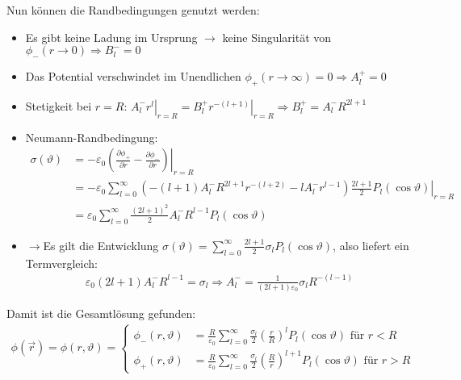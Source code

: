 		   Nun können die Randbedingungen genutzt werden:
		   \begin{itemize}
		   	\item Es gibt keine Ladung im Ursprung $\to$ keine Singularität von $\phi_-(r\to 0) \Rightarrow \boxed{B_l^- =0}$
		   	\item Das Potential verschwindet im Unendlichen $\phi_+(r\to \infty) = 0  \Rightarrow \boxed{A_l^+ =0}$
		   	\item Stetigkeit bei $r=R$: $\left. A_{l}^- r^l\right|_{r=R} = \left. B_{l}^+ r^{-(l+1)}\right|_{r=R} \Rightarrow \boxed{B_{l}^+ = A_{l}^- R^{2l+1} } $
		   	\item Neumann-Randbedingung:
		        \begin{equation}\begin{split}
				        \sigma(\vartheta) &= -\varepsilon_0 \left.\left( \frac{\partial \phi_+}{\partial r} - \frac{\partial \phi_-}{\partial r}\right)\right|_{r=R} \\
				        & = \left. -\varepsilon_0 \sum_{l=0}^{\infty} \left( -(l+1) A_{l}^- R^{2l+1} r^{-(l+2)}- l A_{l}^- r^{l-1}\right) \frac{2l+1}{2} P_l (\cos\vartheta) \right|_{r=R} \\
				        &= \varepsilon_0 \sum_{l=0}^{\infty} \frac{(2l+1)^2}{2} A_{l}^- R^{l-1} P_l (\cos\vartheta)
			        \end{split}\end{equation}
		   \item[]$\to$Es gilt die Entwicklung $\sigma(\vartheta) = \sum_{l=0}^{\infty}  \frac{2l+1}{2} \sigma_l P_l (\cos\vartheta)$, also liefert ein Termvergleich:
		        \begin{equation}\begin{split}
				        \varepsilon_0 (2l+1) A_{l}^- R^{l-1} = \sigma_l \Rightarrow \boxed{ A_{l}^- = \frac{1}{(2l+1)\varepsilon_0}\sigma_l  R^{-(l-1)}}
			        \end{split}\end{equation}
		        		   \end{itemize}
		   Damit ist die Gesamtlösung gefunden:
		        \begin{equation}\label{GesamtLsg}\begin{split}
				        \phi(\vec{r} ) = \phi(r,\vartheta) =
				        \begin{cases}
					        \phi_-(r,\vartheta) & = \frac{R}{\varepsilon_0} \sum_{l=0}^{\infty} \frac{\sigma_l}{2} \left(\frac{r}{R}\right)^l P_l(\cos\vartheta) \text{ für } r<R     \\
					        \phi_+(r,\vartheta) & = \frac{R}{\varepsilon_0} \sum_{l=0}^{\infty} \frac{\sigma_l}{2} \left(\frac{R}{r}\right)^{l+1} P_l(\cos\vartheta) \text{ für } r>R 
				        \end{cases}
			        \end{split}\end{equation}
